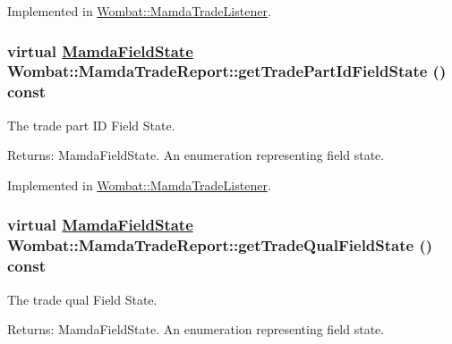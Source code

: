 Implemented in \hyperlink{classWombat_1_1MamdaTradeListener_5fa909b1c87c6380e204dba43ab9baa7}{Wombat::Mamda\-Trade\-Listener}.\hypertarget{classWombat_1_1MamdaTradeReport_3b5756a75180c823a4908d3d2b820d3a}{
\subsubsection[getTradePartIdFieldState]{\setlength{\rightskip}{0pt plus 5cm}virtual \hyperlink{namespaceWombat_93aac974f2ab713554fd12a1fa3b7d2a}{Mamda\-Field\-State} Wombat::Mamda\-Trade\-Report::get\-Trade\-Part\-Id\-Field\-State () const}}
\label{classWombat_1_1MamdaTradeReport_3b5756a75180c823a4908d3d2b820d3a}


The trade part ID Field State. 

\begin{Desc}
\item[Returns:]Mamda\-Field\-State. An enumeration representing field state. \end{Desc}


Implemented in \hyperlink{classWombat_1_1MamdaTradeListener_e386075d2c6a4d5f33d25e820ac81559}{Wombat::Mamda\-Trade\-Listener}.\hypertarget{classWombat_1_1MamdaTradeReport_902afe48248ed43e56d481ba755888b6}{
\subsubsection[getTradeQualFieldState]{\setlength{\rightskip}{0pt plus 5cm}virtual \hyperlink{namespaceWombat_93aac974f2ab713554fd12a1fa3b7d2a}{Mamda\-Field\-State} Wombat::Mamda\-Trade\-Report::get\-Trade\-Qual\-Field\-State () const}}
\label{classWombat_1_1MamdaTradeReport_902afe48248ed43e56d481ba755888b6}


The trade qual Field State. 

\begin{Desc}
\item[Returns:]Mamda\-Field\-State. An enumeration representing field state. \end{Desc}


